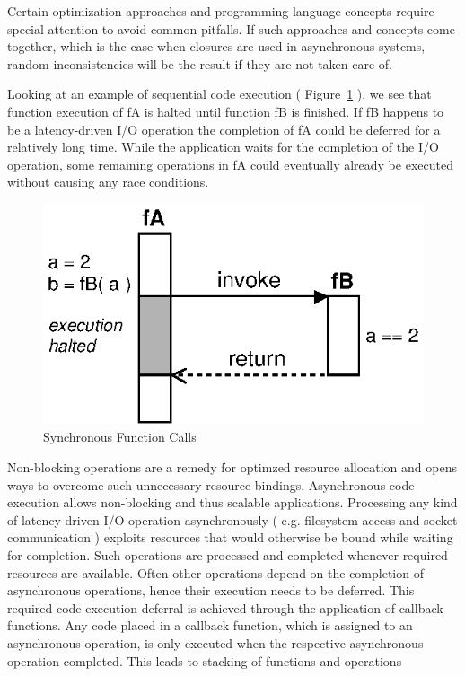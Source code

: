 
Certain optimization approaches and programming language concepts require special attention to avoid common pitfalls.
If such approaches and concepts come together, which is the case when closures are used in asynchronous systems, random inconsistencies will be the result if they are not taken care of.


Looking at an example of sequential code execution ( Figure~\ref{fig:Closures_Synchronous} ), we see that function execution of fA is halted until function fB is finished.
If fB happens to be a latency-driven I/O operation the completion of fA could be deferred for a relatively long time.
While the application waits for the completion of the I/O operation, some remaining operations in fA could eventually already be executed without causing any race conditions.

\begin{figure}[h!]
\centering
  \includegraphics{figures/Closures_Synchronous}
\caption{Synchronous Function Calls}
\label{fig:Closures_Synchronous}
\end{figure}

Non-blocking operations are a remedy for optimzed resource allocation and opens ways to overcome such unnecessary resource bindings.
Asynchronous code execution allows non-blocking and thus scalable applications.
Processing any kind of latency-driven I/O operation asynchronously ( e.g. filesystem access and socket communication ) exploits resources that would otherwise be bound while waiting for completion.
Such operations are processed and completed whenever required resources are available.
Often other operations depend on the completion of asynchronous operations, hence their execution needs to be deferred.
This required code execution deferral is achieved through the application of callback functions.
Any code placed in a callback function, which is assigned to an asynchronous operation, is only executed when the respective asynchronous operation completed.
This leads to stacking of functions and operations



